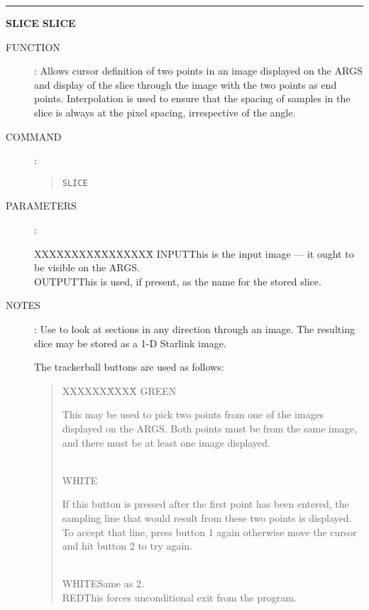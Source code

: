\goodbreak
\rule{\textwidth}{0.3mm}
{\Large {\bf SLICE} \hfill {\bf SLICE}}
\begin{description}
\item [FUNCTION]:
Allows cursor definition of two points in an image displayed on the ARGS and
display of the slice through the image with the two points as end points.
Interpolation is used to ensure that the spacing of samples in the slice is
always at the pixel spacing, irrespective of the angle.
\item [COMMAND]:
\begin{quote}
{\tt SLICE}
\end{quote}
\item [PARAMETERS] :
\begin{tabbing}
XXXXXXXX\=XXXXXXXX\=\kill
INPUT\>\>This is the input image ---  it ought to be visible on the ARGS.\\
OUTPUT\>\>This is used, if present, as the name for the stored slice.
\end{tabbing}
\item [NOTES]:
Use to look at sections in any direction through an image.
The resulting slice may be stored as a 1-D Starlink image.

The trackerball buttons are used as follows:
\begin{quote}
\begin{tabbing}
XXXXXX\=XXXX\=\kill
GREEN\>\begin{minipage}[t]{100mm}
This may be used to pick two points from one of the images displayed on the
ARGS.
Both points must be from the same image, and there must be at least one image
displayed.
\end{minipage}\\
WHITE\>\begin{minipage}[t]{100mm}
If this button is pressed after the first point has been entered, the sampling
line that would result from these two points is displayed.
To accept that line, press button 1 again otherwise move the cursor and hit
button 2 to try again.
\end{minipage}\\
WHITE\>Same as 2.\\
RED\>This forces unconditional exit from the program.
\end{tabbing}
\end{quote}
\end{description}


